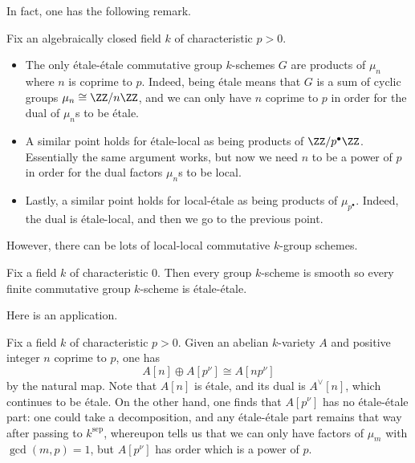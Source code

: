 \documentclass[../notes.tex]{subfiles}
\begin{document}
In fact, one has the following remark.
\begin{remark} \label{rem:classify-pieces-of-group-scheme}
	Fix an algebraically closed field $k$ of characteristic $p>0$.
	\begin{itemize}
		\item The only \'etale-\'etale commutative group $k$-schemes $G$ are products of $\mu_n$ where $n$ is coprime to $p$. Indeed, being \'etale means that $G$ is a sum of cyclic groups $\mu_n\cong\ZZ/n\ZZ$, and we can only have $n$ coprime to $p$ in order for the dual of $\mu_n$s to be \'etale.
		\item A similar point holds for \'etale-local as being products of $\ZZ/p^\bullet\ZZ$. Essentially the same argument works, but now we need $n$ to be a power of $p$ in order for the dual factors $\mu_n$s to be local.
		\item Lastly, a similar point holds for local-\'etale as being products of $\mu_{p^\bullet}$. Indeed, the dual is \'etale-local, and then we go to the previous point.
	\end{itemize}
	However, there can be lots of local-local commutative $k$-group schemes.%
\end{remark}
\begin{remark}
	Fix a field $k$ of characteristic $0$. Then every group $k$-scheme is smooth so every finite commutative group $k$-scheme is \'etale-\'etale.
\end{remark}
Here is an application.
\begin{remark}
	Fix a field $k$ of characteristic $p>0$. Given an abelian $k$-variety $A$ and positive integer $n$ coprime to $p$, one has
	\[A[n]\oplus A\left[p^\nu\right]\cong A\left[np^\nu\right]\]
	by the natural map. Note that $A[n]$ is \'etale, and its dual is $A^\lor[n]$, which continues to be \'etale. On the other hand, one finds that $A[p^\nu]$ has no \'etale-\'etale part: one could take a decomposition, and any \'etale-\'etale part remains that way after passing to $k^{\mathrm{sep}}$, whereupon  tells us that we can only have factors of $\mu_m$ with $\gcd(m,p)=1$, but $A[p^\nu]$ has order which is a power of $p$.
\end{remark}
\end{document}
